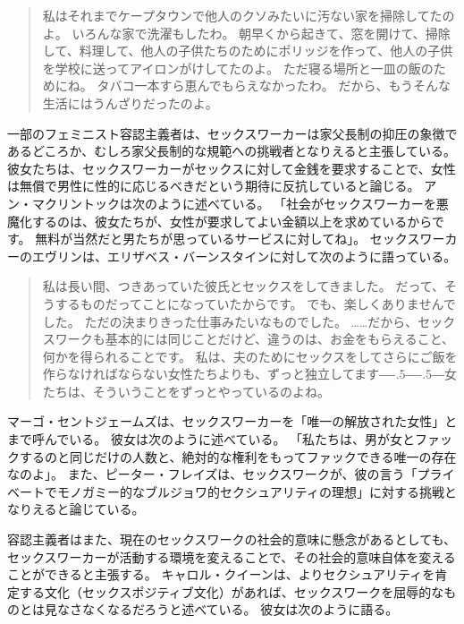 \documentclass[paper=a4,book,openany]{jlreq}
\newcommand{\ig}[1]{}           %
\def\DDASH{―\kern-.5\zw―\kern-.5\zw―} %
\begin{document}
\begin{quote}
私はそれまでケープタウンで他人のクソみたいに汚ない家を掃除してたのよ。
いろんな家で洗濯もしたわ。
朝早くから起きて、窓を開けて、掃除して、料理して、他人の子供たちのためにポリッジを作って、他人の子供を学校に送ってアイロンがけしてたのよ。
ただ寝る場所と一皿の飯のためにね。
タバコ一本すら恵んでもらえなかったわ。
だから、もうそんな生活にはうんざりだったのよ。
\citep[p.49]{mac18:_revol_prost}
\end{quote}

一部のフェミニスト容認主義者は、セックスワーカーは家父長制の抑圧の象徴であるどころか、むしろ家父長制的な規範への挑戦者となりえると主張している。
彼女たちは、セックスワーカーがセックスに対して金銭を要求することで、女性は無償で男性に性的に応じるべきだという期待に反抗していると論じる。
アン・マクリントックは次のように述べている。
「社会がセックスワーカーを悪魔化するのは、彼女たちが、女性が要求してよい金額以上を求めているからです。
無料が当然だと男たちが思っているサービスに対してね」\citep[p.1]{mcclintock93:_sex_worker_sex_work}。
セックスワーカーのエヴリンは、エリザベス・バーンスタインに対して次のように語っている。

\begin{quote}
私は長い間、つきあっていた彼氏とセックスをしてきました。
だって、そうするものだってことになっていたからです。
でも、楽しくありませんでした。
ただの決まりきった仕事みたいなものでした。
……だから、セックスワークも基本的には同じことだけど、違うのは、お金をもらえること、何かを得られることです。
私は、夫のためにセックスをしてさらにご飯を作らなければならない女性たちよりも、ずっと独立してます{\DDASH}女たちは、そういうことをずっとやっているのよね。
\citep[p.106]{bernstein99:_whats_wrong_prost}\ig{Elizabeth Bernstein}
\end{quote}

マーゴ・セントジェームズは、セックスワーカーを「唯一の解放された女性」とまで呼んでいる。
彼女は次のように述べている。
「私たちは、男が女とファックするのと同じだけの人数と、絶対的な権利をもってファックできる唯一の存在なのよ」\citep[p.84]{james87:_reclam_whores}。
また、ピーター・フレイズは、セックスワークが、彼の言う「プライベートでモノガミー的なブルジョワ的セクシュアリティの理想」に対する挑戦となりえると論じている\citep{frase12:_probl_sex_work}。

容認主義者はまた、現在のセックスワークの社会的意味に懸念があるとしても、セックスワーカーが活動する環境を変えることで、その社会的意味自体を変えることができると主張する。
キャロル・クイーンは、よりセクシュアリティを肯定する文化（セックスポジティブ文化）があれば、セックスワークを屈辱的なものとは見なさなくなるだろうと述べている。
彼女は次のように語る。
\end{document}
